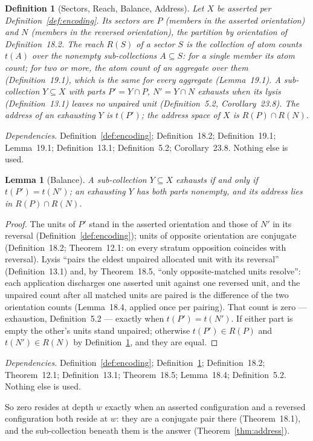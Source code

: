 \documentclass[pdflatex,sn-mathphys-num]{sn-jnl}
\theoremstyle{thmstyleone}%
\newtheorem{lemma}[theorem]{Lemma}
\theoremstyle{thmstyletwo}%
\theoremstyle{thmstylethree}%
\newtheorem{definition}{Definition}[section]
\newtheorem{lemma}[theorem]{Lemma}
\newtheorem{definition}{Definition}[section]
\newcommand{\q}[1]{``#1''}        %
\newcommand{\deps}[1]{\par\begin{sloppypar}\noindent\emph{Dependencies.} #1 Nothing else is used.\end{sloppypar}}
\begin{document}
\begin{definition}[Sectors, Reach, Balance, Address]\label{def:address}
Let $X$ be asserted per Definition~\ref{def:encoding}. Its \emph{sectors} are $P$ (members in the asserted orientation) and $N$ (members in the reversed orientation), the partition by orientation of Definition~18.2. The \emph{reach} $R(S)$ of a sector $S$ is the collection of atom counts $t(A)$ over the nonempty sub-collections $A\subseteq S$: for a single member its atom count; for two or more, the atom count of an aggregate over them (Definition~19.1), which is the same for every aggregate (Lemma~19.1). A sub-collection $Y\subseteq X$ with parts $P'=Y\cap P$, $N'=Y\cap N$ \emph{exhausts} when its lysis (Definition~13.1) leaves no unpaired unit (Definition~5.2, Corollary~23.8). The \emph{address} of an exhausting $Y$ is $t(P')$; the \emph{address space} of $X$ is $R(P)\cap R(N)$.
\end{definition}
\deps{Definition~\ref{def:encoding}; Definition~18.2; Definition~19.1; Lemma~19.1; Definition~13.1; Definition~5.2; Corollary~23.8.}

\begin{lemma}[Balance]\label{lem:balance}
A sub-collection $Y\subseteq X$ exhausts if and only if $t(P')=t(N')$; an exhausting $Y$ has both parts nonempty, and its address lies in $R(P)\cap R(N)$.
\end{lemma}
\begin{proof}
The units of $P'$ stand in the asserted orientation and those of $N'$ in its reversal (Definition~\ref{def:encoding}); units of opposite orientation are conjugate (Definition~18.2; Theorem~12.1: on every stratum opposition coincides with reversal). Lysis \q{pairs the eldest unpaired allocated unit with its reversal} (Definition~13.1) and, by Theorem~18.5, \q{only opposite-matched units resolve}: each application discharges one asserted unit against one reversed unit, and the unpaired count after all matched units are paired is the difference of the two orientation counts (Lemma~18.4, applied once per pairing). That count is zero --- exhaustion, Definition~5.2 --- exactly when $t(P')=t(N')$. If either part is empty the other's units stand unpaired; otherwise $t(P')\in R(P)$ and $t(N')\in R(N)$ by Definition~\ref{def:address}, and they are equal.
\end{proof}
\deps{Definition~\ref{def:encoding}; Definition~\ref{def:address}; Definition~18.2; Theorem~12.1; Definition~13.1; Theorem~18.5; Lemma~18.4; Definition~5.2.}

\noindent So zero resides at depth $w$ exactly when an asserted configuration and a reversed configuration both reside at $w$: they are a conjugate pair there (Theorem~18.1), and the sub-collection beneath them is the answer (Theorem~\ref{thm:address}).
\end{document}
